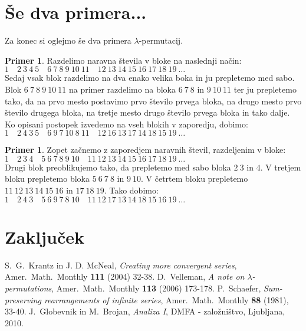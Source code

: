 \documentclass[12pt,a4paper,reqno]{amsart}
\theoremstyle{definition} %
\newtheorem{primer}[definicija]{Primer}
\theoremstyle{plain} %
\begin{document}
\section{Še dva primera...}

Za konec si oglejmo še dva primera $\lambda$-permutacij.

\begin{primer}
Razdelimo naravna števila v bloke na naslednji način:\\

$1 \quad 2\: 3\: 4\: 5 \quad 6\: 7\: 8\: 9\: 10\: 11 \quad 12\: 13\: 14\: 15\: 16\: 17\: 18\: 19\: \ldots $\\

Sedaj vsak blok razdelimo na dva enako velika boka in ju prepletemo med sabo. Blok $6\: 7\: 8\: 9\: 10\: 11$ na primer razdelimo na bloka $6\: 7\: 8$ in $9\: 10\: 11$ ter ju prepletemo tako, da na prvo mesto postavimo prvo število prvega bloka, na drugo mesto prvo število drugega bloka, na tretje mesto drugo število prvega bloka in tako dalje. Ko opisani postopek izvedemo na vseh blokih v zaporedju, dobimo:\\

$1 \quad 2\: 4\: 3\: 5 \quad 6\: 9\: 7\: 10\: 8\: 11 \quad 12\: 16\: 13\: 17\: 14\: 18\: 15\: 19\: \ldots $
\end{primer}

\begin{primer}
Zopet začnemo z zaporedjem naravnih števil, razdeljenim v bloke:\\

$1 \quad 2\: 3\: 4\quad 5\: 6\: 7\: 8\: 9\: 10 \quad 11\: 12\: 13\: 14\: 15\: 16\:17\: 18\: 19\: \ldots $\\

Drugi blok preoblikujemo tako, da prepletemo med sabo bloka $2\: 3$ in $4$. V tretjem bloku prepletemo bloka $5\: 6\: 7\: 8$ in $9\: 10$. V četrtem bloku prepletemo $11\: 12\: 13\: 14\: 15\: 16$ in $17\: 18\: 19$. Tako dobimo:\\

$1 \quad 2\: 4\: 3\quad 5\: 6\: 9\: 7\: 8\: 10 \quad 11\: 12\: 17\: 13\: 14\: 18\: 15\: 16\: 19\: \ldots $

\end{primer}

\section{Zaključek}



\begin{thebibliography}{99}

S.~G.~Krantz in J. D. McNeal, \textit{Creating more convergent series}, Amer.~Math.~Monthly \textbf{111} (2004) 32-38.
D.~Velleman, \textit{A note on $\lambda$-permutations}, Amer.~Math.~Monthly \textbf{113} (2006) 173-178.
P.~Schaefer, \textit{Sum-preserving rearrangements of infinite series}, Amer.~Math.~Monthly \textbf{88} (1981), 33-40.
J.~Globevnik in M.~Brojan, \textit{Analiza I},  DMFA - založništvo, Ljubljana, 2010.

\end{thebibliography}
\end{document}
